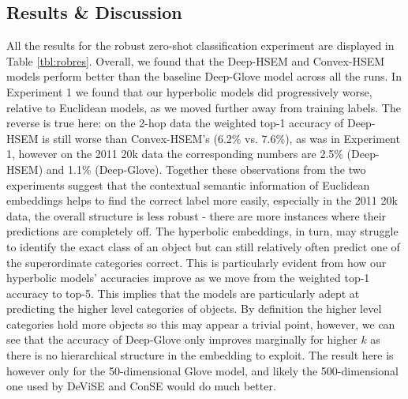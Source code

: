 \documentclass[12pt]{report}
\begin{document}
\subsection{Results \& Discussion}
All the results for the robust zero-shot classification experiment are displayed in Table \ref{tbl:robres}. Overall, we found that the Deep-HSEM and Convex-HSEM models perform better than the baseline Deep-Glove model across all the runs. In Experiment 1 we found that our hyperbolic models did progressively worse, relative to Euclidean models, as we moved further away from training labels. The reverse is true here: on the 2-hop data the weighted top-1 accuracy of Deep-HSEM is still worse than Convex-HSEM's (6.2\% vs. 7.6\%), as was in Experiment 1, however on the 2011 20k data the corresponding numbers are 2.5\% (Deep-HSEM) and 1.1\% (Deep-Glove). Together these observations from the two experiments suggest that the contextual semantic information of Euclidean embeddings helps to find the correct label more easily, especially in the 2011 20k data, the overall structure is less robust -\- there are more instances where their predictions are completely off. The hyperbolic embeddings, in turn, may struggle to identify the exact class of an object but can still relatively often predict one of the superordinate categories correct. This is particularly evident from how our hyperbolic models' accuracies improve as we move from the weighted top-1 accuracy to top-5. This implies that the models are particularly adept at predicting the higher level categories of objects. By definition the higher level categories hold more objects so this may appear a trivial point, however, we can see that the accuracy of Deep-Glove only improves marginally for higher $k$ as there is no hierarchical structure in the embedding to exploit. The result here is however only for the 50-dimensional Glove model, and likely the 500-dimensional one used by DeViSE and ConSE would do much better.
\end{document}
